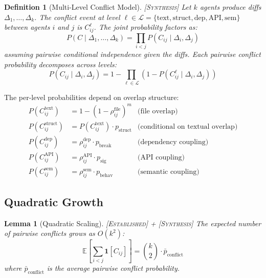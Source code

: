\documentclass[11pt, a4paper, copyright]{googledeepmind}
\newtheorem{definition}{Definition}[section]
\newtheorem{lemma}[theorem]{Lemma}
\newcommand{\established}{\textsc{[Established]}}
\newcommand{\synthesis}{\textsc{[Synthesis]}}
\begin{document}
\begin{definition}[Multi-Level Conflict Model] \synthesis{}
\label{def:conflict-pgm}
Let $k$ agents produce diffs $\Delta_1, \ldots, \Delta_k$.
The conflict event at level $\ell \in \mathcal{L} = \{\mathrm{text}, \mathrm{struct}, \mathrm{dep}, \mathrm{API}, \mathrm{sem}\}$ between agents $i$ and $j$ is $C_{ij}^\ell$.
The joint probability factors as:
\begin{equation}
  P(C \mid \Delta_1, \ldots, \Delta_k) = \prod_{i < j} P(C_{ij} \mid \Delta_i, \Delta_j)
\end{equation}
assuming pairwise conditional independence given the diffs.
Each pairwise conflict probability decomposes across levels:
\begin{equation}
  P(C_{ij} \mid \Delta_i, \Delta_j) = 1 - \prod_{\ell \in \mathcal{L}} \left(1 - P(C_{ij}^\ell \mid \Delta_i, \Delta_j)\right)
\end{equation}
\end{definition}

The per-level probabilities depend on overlap structure:
\begin{align}
  P(C_{ij}^{\mathrm{text}}) &= 1 - (1 - \rho_{ij}^{\mathrm{file}})^{m} & \text{(file overlap)} \\
  P(C_{ij}^{\mathrm{struct}}) &= P(C_{ij}^{\mathrm{text}}) \cdot p_{\mathrm{struct}} & \text{(conditional on textual overlap)} \\
  P(C_{ij}^{\mathrm{dep}}) &= \rho_{ij}^{\mathrm{dep}} \cdot p_{\mathrm{break}} & \text{(dependency coupling)} \\
  P(C_{ij}^{\mathrm{API}}) &= \rho_{ij}^{\mathrm{API}} \cdot p_{\mathrm{sig}} & \text{(API coupling)} \\
  P(C_{ij}^{\mathrm{sem}}) &= \rho_{ij}^{\mathrm{sem}} \cdot p_{\mathrm{behav}} & \text{(semantic coupling)}
\end{align}

\subsection{Quadratic Growth}

\begin{lemma}[Quadratic Scaling] \established{} + \synthesis{}
\label{lem:quadratic}
The expected number of pairwise conflicts grows as $O(k^2)$:
\begin{equation}
  \mathbb{E}\!\left[\sum_{i<j} \mathbf{1}[C_{ij}]\right] = \binom{k}{2} \cdot \bar{p}_{\mathrm{conflict}}
\end{equation}
where $\bar{p}_{\mathrm{conflict}}$ is the average pairwise conflict probability.
\end{lemma}
\end{document}

